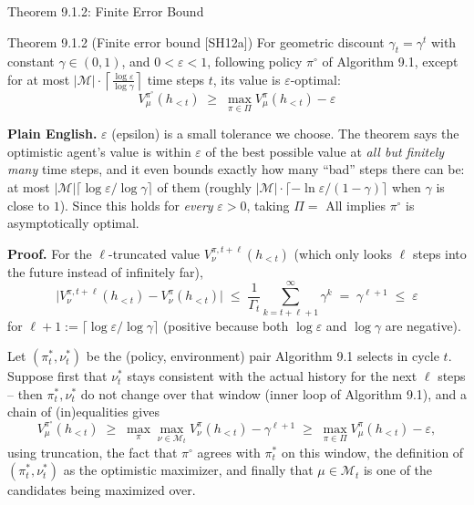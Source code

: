 \documentclass[aspectratio=169,10pt]{beamer}
\begin{document}
\begin{frame}[allowframebreaks]{Theorem 9.1.2: Finite Error Bound}
  \begin{block}{Theorem 9.1.2 (Finite error bound [SH12a])}
    For geometric discount $\gamma_t=\gamma^t$ with constant
    $\gamma\in(0,1)$, and $0<\varepsilon<1$, following policy $\pi^\circ$ of
    Algorithm 9.1, except for at most
    $|\mathcal{M}|\cdot\left\lceil\frac{\log\varepsilon}{\log\gamma}\right\rceil$
    time steps $t$, its value is $\varepsilon$-optimal:
    \[
      V^{\pi^\circ}_\mu(h_{<t}) \;\ge\; \max_{\pi\in\Pi} V^\pi_\mu(h_{<t}) - \varepsilon
    \]
  \end{block}
  \textbf{Plain English.} $\varepsilon$ (epsilon) is a small tolerance we
  choose. The theorem says the optimistic agent's value is within
  $\varepsilon$ of the best possible value at \emph{all but finitely many}
  time steps, and it even bounds exactly how many ``bad'' steps there can
  be: at most $|\mathcal{M}|\lceil\log\varepsilon/\log\gamma\rceil$ of them
  (roughly $|\mathcal{M}|\cdot\lceil -\ln\varepsilon/(1-\gamma)\rceil$ when
  $\gamma$ is close to $1$). Since this holds for \emph{every}
  $\varepsilon>0$, taking $\Pi=$ All implies $\pi^\circ$ is asymptotically
  optimal.

  \framebreak

  \textbf{Proof.} For the $\ell$-truncated value $V^{\pi,t+\ell}_\nu(h_{<t})$
  (which only looks $\ell$ steps into the future instead of infinitely far),
  \[
    \big|V^{\pi,t+\ell}_\nu(h_{<t}) - V^\pi_\nu(h_{<t})\big| \;\le\;
    \frac{1}{\Gamma_t}\sum_{k=t+\ell+1}^{\infty}\gamma^k \;=\; \gamma^{\ell+1} \;\le\; \varepsilon
  \]
  for $\ell+1 := \big\lceil \log\varepsilon/\log\gamma \big\rceil$ (positive
  because both $\log\varepsilon$ and $\log\gamma$ are negative).

  Let $(\pi^*_t,\nu^*_t)$ be the (policy, environment) pair Algorithm 9.1
  selects in cycle $t$. Suppose first that $\nu^*_t$ stays consistent with
  the actual history for the next $\ell$ steps -- then $\pi^*_t,\nu^*_t$
  do not change over that window (inner loop of Algorithm 9.1), and a chain
  of (in)equalities gives
  \[
    V^{\pi^\circ}_\mu(h_{<t}) \;\ge\; \max_\pi\max_{\nu\in\mathcal{M}_t}V^\pi_\nu(h_{<t}) - \gamma^{\ell+1}
    \;\ge\; \max_{\pi\in\Pi}V^\pi_\mu(h_{<t}) - \varepsilon,
  \]
  using truncation, the fact that $\pi^\circ$ agrees with $\pi^*_t$ on this
  window, the definition of $(\pi^*_t,\nu^*_t)$ as the optimistic maximizer,
  and finally that $\mu\in\mathcal{M}_t$ is one of the candidates being
  maximized over.


\end{frame}
\end{document}
